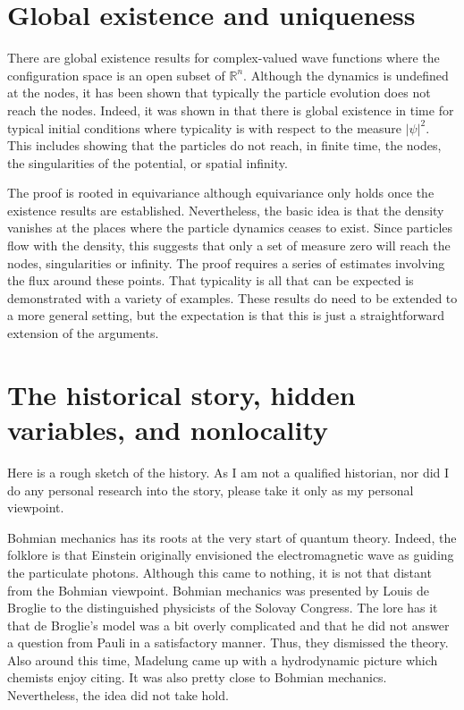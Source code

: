 \documentclass[11pt]{article}
\theoremstyle{remark}
\begin{document}
\section{Global existence and uniqueness}

There are global existence results for complex-valued wave functions where the
configuration space is an open subset of \ensuremath{\mathbb{R}^{n}}.  
Although the
dynamics is undefined at the nodes, 
 it has been shown that typically the particle
evolution does not reach the nodes.  Indeed, it was shown 
in \cite{BDGZ95} that 
there is  
 global existence in time for typical 
 initial conditions where typicality is with respect 
to the measure $|\ensuremath{\psi}|^2$. This includes showing that the particles do
not reach, in finite time,  the nodes, the singularities of the
potential, or
 spatial
infinity.  

The proof is rooted in equivariance although equivariance only holds
once the existence results are established. Nevertheless, 
the basic idea is that the density vanishes at the places where the
particle dynamics ceases to exist. Since particles flow with the
density, this suggests that only a set of measure zero will reach the nodes,
singularities or infinity. The proof requires a series of estimates
involving the flux around these points. That typicality is all that
can be expected is demonstrated with a variety of examples.
These results do need to be extended to a more general setting, but
the expectation is that this is just a straightforward extension of
the arguments. 

\section{The historical story, hidden variables, and nonlocality}

Here is a rough sketch of the history. As I am not a qualified
historian, nor did I do any personal research into the story, please
take it only as my personal viewpoint. 

Bohmian mechanics has its roots at the very start of quantum
theory. Indeed, the folklore is that Einstein originally envisioned
the electromagnetic wave as guiding the particulate photons. Although
this came to nothing, it is not that distant from the Bohmian
viewpoint.  Bohmian mechanics was presented by Louis
de Broglie to the distinguished physicists of the Solovay
Congress. The lore has it that de Broglie's model was a bit overly
complicated and that he did not answer a question from Pauli in a
satisfactory manner. Thus, they dismissed the
theory. Also around this time, Madelung came up with a hydrodynamic
picture which chemists enjoy citing. It was also pretty close to Bohmian
mechanics. Nevertheless, the idea did not take hold. 
\end{document}
